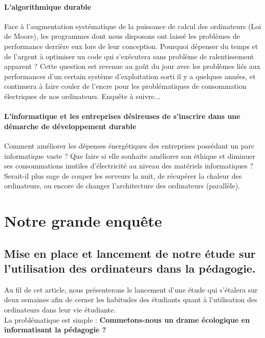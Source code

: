 \documentclass[a4paper,11pt,french]{report}
\begin{document}
\subsubsection{L'algorithmique durable}
Face à l'augmentation systématique de la puissance de calcul des ordinateurs (Loi de Moore), les programmes dont nous disposons ont laissé les problèmes de performance derrière eux lors de leur conception. Pourquoi dépenser du temps et de l'argent à optimiser un code qui s'exécutera sans problème de ralentissement apparent ? 
Cette question est revenue au goût du jour avec les problèmes liés aux performances d'un certain système d'exploitation sorti il y a quelques années, et continuera à faire couler de l'encre pour les problématiques de consommation électriques de nos ordinateurs. Enquête à suivre... \\

\subsubsection{L'informatique et les entreprises désireuses de s'inscrire dans une démarche de développement durable}
Comment améliorer les dépenses énergétiques des entreprises possédant un parc informatique vaste ? 
Que faire si elle souhaite améliorer son éthique et diminuer ses consommations inutiles d'électricité au niveau des matériels informatiques ?\\
Serait-il plus sage de couper les serveurs la nuit, de récupérer la chaleur des ordinateurs, ou encore de changer l'architecture des ordinateurs (parallèle).


\newpage
\chapter{Notre grande enquête}

\section[Lancement de l'étude]{Mise en place et lancement de notre étude sur l'utilisation des ordinateurs dans la pédagogie.}
Au fil de cet article, nous présenterons le lancement d'une étude qui s'étalera sur deux semaines afin de cerner les habitudes des étudiants quant à l'utilisation des ordinateurs dans leur vie étudiante.\\

La problématique est simple : \textbf{Commetons-nous un drame écologique en informatisant la pédagogie ?}\\
\end{document}

